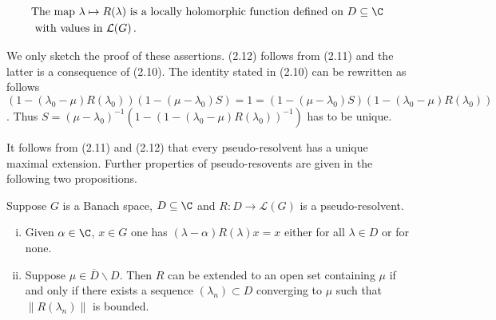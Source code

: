 \begin{equation}\label{eq:c3-2.12}
	\begin{aligned}
	&\text{The map $\lambda \mapsto R(\lambda)$ is a locally holomorphic function defined on  $D \subseteq \C $}\\ 
	&\text{ with values in  $\mathcal{L}(G)$}\,.
	\end{aligned}
\end{equation}

We only sketch the proof of these assertions. (2.12) follows from (2.11) and the latter is a consequence of (2.10).
The identity stated in (2.10) can be rewritten as follows 
$(1-(\lambda_{0}-\mu)R(\lambda_{0}))(1-(\mu-\lambda_{0})S) = 1 = (1-(\mu-\lambda_{0})S)(1-(\lambda_{0}-\mu)R(\lambda_{0}))$.
Thus $S = (\mu-\lambda_{0})^{-1}(1 - (1-(\lambda_{0}-\mu)R(\lambda_{0}))^{-1})$ has to be unique.

It follows from (2.11) and (2.12) that every pseudo-resolvent has a unique maximal extension.
Further properties of pseudo-resovents are given in the following two propositions.

\begin{proposition}\label{prop:c3-2.6}
	Suppose $G$ is a Banach space, $D \subseteq \C $ and $R \colon D \to \mathcal{L}(G)$ is a pseudo-resolvent.
	
	\begin{enumerate}[(i), wide]
		\item Given $\alpha \in \C $, $x \in G$ one has $(\lambda-\alpha)R(\lambda)x = x$ either for all $\lambda \in D$ or for none.
		
		\item Suppose $\mu \in \overline{D}\backslash D$. Then $R$ can be extended to an open set containing $\mu$ if and only if there exists a sequence $(\lambda_{n}) \subset D$ converging to $\mu$ such that $\|R(\lambda_{n})\|$ is bounded.
	\end{enumerate}
\end{proposition}

